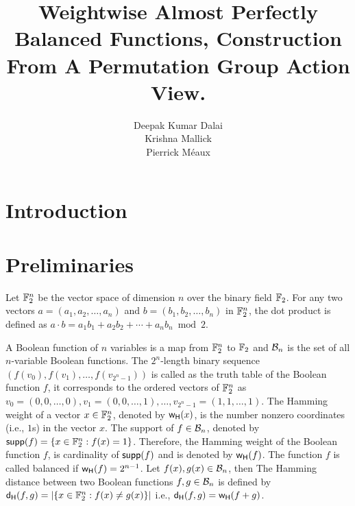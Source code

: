 \documentclass{llncs}
\begin{document}
\title{Weightwise Almost Perfectly Balanced Functions, Construction From A Permutation Group Action View.}
		

\ifnum{}
\author{
Deepak Kumar Dalai\\
Krishna Mallick\\
Pierrick M\'eaux
}

\fi
\maketitle


\setcounter{page}{1}	
\begin{abstract}
\end{abstract}
 
\section{Introduction} 
\section{Preliminaries}
Let $\mathbb{F}_2^n$ be the vector space of dimension $n$ over the binary field $\mathbb{F}_2$. For any two vectors $a=(a_1, a_2, \ldots, a_n)$ and $b = (b_1, b_2, \ldots, b_n)$ in $\mathbb{F}_2^n$, the dot product is defined as $a\cdot b = a_1 b_1 + a_2 b_2 + \cdots + a_nb_n \bmod 2$.

A Boolean function of $n$ variables is a map from $\mathbb{F}_2^n$ to $\mathbb{F}_2$ and $\mathcal{B}_n$ is the set of all $n$-variable Boolean functions. 
The $2^n$-length binary sequence $(f(v_0), f(v_1), \ldots, f(v_{2^n-1}))$ is called as the truth table of the Boolean function $f$, it corresponds to the ordered vectors of $\mathbb{F}_2^n$ as $v_0 = (0,0,\ldots,0), v_1= (0,0,\ldots,1),\ldots, v_{2^n-1}=(1,1,\ldots,1)$. 
The Hamming weight of a vector $x \in \mathbb{F}_2^n$, denoted by $\mathsf{w_H}(x)$, is the number nonzero coordinates (i.e., $1$s) in the vector $x$. The support of $f \in \mathcal{B}_n$, denoted by $\mathsf{supp}(f)= \{x \in \mathbb{F}_2^n : f(x) = 1\}$. Therefore, the Hamming weight of the Boolean function $f$, is cardinality of $\mathsf{supp}(f)$ and is denoted by $\mathsf{w_H}(f)$. The function $f$ is called balanced if $\mathsf{w_H}(f)= 2^{n-1}$. Let $f(x), g(x) \in \mathcal{B}_n$, then 
The Hamming distance between two Boolean functions $f, g \in \mathcal{B}_n$ is defined by $\mathsf{d_H}(f,g) = |\{x \in \mathbb{F}_2^n : f(x) \neq g(x) \}|$  i.e., $\mathsf{d_H}(f,g) = \mathsf{w_H}(f + g)$.
\end{document}
